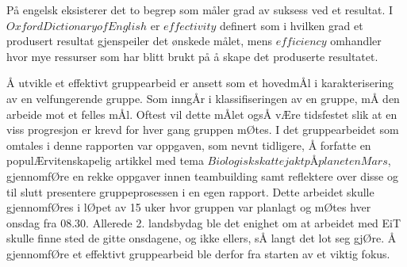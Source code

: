 







På engelsk eksisterer det to begrep som måler grad av suksess ved et resultat. 
I $Oxford Dictionary of English$ er $effectivity$ definert som i hvilken grad et produsert resultat gjenspeiler det ønskede målet, mens $efficiency$ omhandler hvor mye ressurser som har blitt brukt på å skape det produserte resultatet. 

Å utvikle et effektivt gruppearbeid er ansett som et hovedmÅl i karakterisering av en velfungerende gruppe. 
Som inngÅr i klassifiseringen av en gruppe, mÅ den arbeide mot et felles mÅl. 
Oftest vil dette mÅlet ogsÅ vÆre tidsfestet slik at en viss progresjon er krevd for hver gang gruppen mØtes. 
I det gruppearbeidet som omtales i denne rapporten var oppgaven, som nevnt tidligere, Å forfatte en populÆrvitenskapelig artikkel med tema $Biologisk skattejakt pÅ planeten Mars$, gjennomfØre en rekke oppgaver innen teambuilding samt reflektere over disse og til slutt presentere gruppeprosessen i en egen rapport. 
Dette arbeidet skulle gjennomfØres i lØpet av 15 uker hvor gruppen var planlagt og mØtes hver onsdag fra 08.30. 
Allerede 2. landsbydag ble det enighet om at arbeidet med EiT skulle finne sted de gitte onsdagene, og ikke ellers, sÅ langt det lot seg gjØre. 
Å gjennomfØre et effektivt gruppearbeid ble derfor fra starten av et viktig fokus. 

